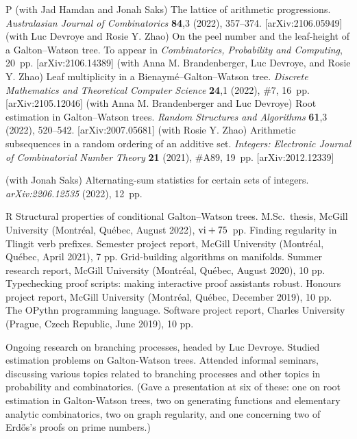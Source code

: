 \begingroup\frenchspacing
{}
\pubbegin P
\papitem (with Jad Hamdan and Jonah Saks)
The lattice of arithmetic progressions.
{\sl Australasian Journal of Combinatorics}\/ {\bf 84},3 (2022), 357--374.
[arXiv:2106.05949]
\papitem (with Luc Devroye and Rosie Y. Zhao)
On the peel number and the leaf-height of a Galton--Watson tree.
To appear in {\sl Combinatorics, Probability and Computing}, 20~pp. [arXiv:2106.14389]
\papitem (with Anna M. Brandenberger, Luc Devroye, and Rosie Y. Zhao)
Leaf multiplicity in a Bienaym\'e--Galton--Watson tree. {\sl Discrete Mathematics
and Theoretical Computer Science}\/ {\bf 24},1 (2022), \#7, 16~pp. [arXiv:2105.12046]
\papitem (with Anna M. Brandenberger and Luc Devroye)
Root estimation in Galton--Watson trees. {\sl Random Structures and Algorithms}\/ {\bf 61},3 (2022), 520--542.
[arXiv:2007.05681]
\papitem (with Rosie Y. Zhao)
Arithmetic subsequences in a random ordering of an additive set.
{\sl Integers: Electronic Journal of Combinatorial Number Theory}\/ {\bf 21} (2021), \#A89, 19~pp.
[arXiv:2012.12339]


\begingroup\parindent=10pt
\thing (with Jonah Saks)
Alternating-sum statistics for certain sets of integers. {\sl arXiv:2206.12535} (2022), 12~pp.
\endgroup
\endgroup%

\goodbreak
{}

\pubbegin R
\repitem Structural properties of conditional Galton--Watson trees. M.Sc.~thesis, McGill University
(Montr\'eal, Qu\'ebec, August 2022), $\hbox{\rm vi} + 75$~pp.
\repitem Finding regularity in Tlingit verb prefixes. Semester project report, McGill University
(Montr\'eal, Qu\'ebec, April 2021), 7 pp.
\repitem Grid-building algorithms on manifolds. Summer research report, McGill University (Montr\'eal, Qu\'ebec,
August 2020), 10 pp.
\repitem Typechecking proof scripts: making interactive proof assistants robust.
Honours project report, McGill University (Montr\'eal, Qu\'ebec, December 2019), 10 pp.
\repitem The OPythn programming language. Software project report, Charles University (Prague,
Czech Republic, June 2019), 10 pp.


\smallskip
Ongoing research on branching processes, headed by Luc Devroye. Studied estimation problems
on Galton-Watson trees. Attended informal seminars, discussing
various topics related to branching
processes and other topics in probability and combinatorics.
(Gave a presentation at six of these: one on root estimation in Galton-Watson
trees, two on generating functions and elementary analytic combinatorics, two on graph regularity, and
one concerning two of Erd\H os's proofs on prime numbers.)

